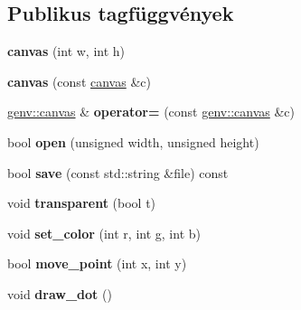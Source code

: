 \subsection*{Publikus tagfüggvények}
\begin{DoxyCompactItemize}
\item 
\mbox{\label{classgenv_1_1canvas_ae4210ffb2450a3ba02df10dc54e51450}} 
{\bfseries canvas} (int w, int h)
\item 
\mbox{\label{classgenv_1_1canvas_a86451ee2e5574e00d3afc56333f531e4}} 
{\bfseries canvas} (const \hyperlink{classgenv_1_1canvas}{canvas} \&c)
\item 
\mbox{\label{classgenv_1_1canvas_ab39f2907cf7fda9c27246e9e644877e8}} 
\hyperlink{classgenv_1_1canvas}{genv\+::canvas} \& {\bfseries operator=} (const \hyperlink{classgenv_1_1canvas}{genv\+::canvas} \&c)
\item 
\mbox{\label{classgenv_1_1canvas_aeb1d899ae60e28a104923d3b63266638}} 
bool {\bfseries open} (unsigned width, unsigned height)
\item 
\mbox{\label{classgenv_1_1canvas_a8f1a7098176b298409a1aeb9dfdb6333}} 
bool {\bfseries save} (const std\+::string \&file) const
\item 
\mbox{\label{classgenv_1_1canvas_a05e9e3bc7664435b02175325e667ffcc}} 
void {\bfseries transparent} (bool t)
\item 
\mbox{\label{classgenv_1_1canvas_a085f91bf2c74631935ba2fe7cc0a6002}} 
void {\bfseries set\+\_\+color} (int r, int g, int b)
\item 
\mbox{\label{classgenv_1_1canvas_a03b50301a46098ee2e0ba4e4203e3995}} 
bool {\bfseries move\+\_\+point} (int x, int y)
\item 
\mbox{\label{classgenv_1_1canvas_a767d2a082da511ab6e84d4d7b98360be}} 
void {\bfseries draw\+\_\+dot} ()
\item 
\mbox{\label{classgenv_1_1canvas_a89a4e72f7064389cbe9418646863e919}} 

\end{DoxyCompactItemize}
